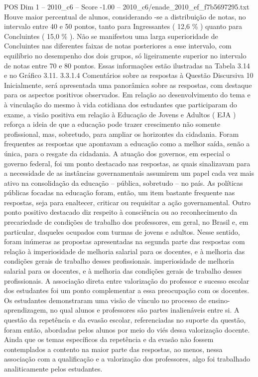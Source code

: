 \begin{textsample}{POS Dim 1 – 2010\_c6 – Score -1.00 – 2010\_c6/enade\_2010\_ef\_f7b5697295.txt}
Houve maior percentual de alunos, considerando -se a distribuição de notas, no intervalo entre 40 e 50 pontos, tanto para Ingressantes ( 12,6 \% ) quanto para Concluintes ( 15,0 \% ).
Não se manifestou uma larga superioridade de Concluintes nas diferentes faixas de notas posteriores a esse intervalo, com equilíbrio no desempenho dos dois grupos, só ligeiramente superior no intervalo de notas entre 70 e 80 pontos.
Essas informações estão ilustradas na Tabela 3.14 e no Gráfico 3.11. 3.3.1.4 Comentários sobre as respostas à Questão Discursiva 10 Inicialmente, será apresentada uma panorâmica sobre as respostas, com destaque para os aspectos positivos observados.
Em relação ao desenvolvimento do tema e à vinculação do mesmo à vida cotidiana dos estudantes que participaram do exame, a visão positiva em relação à Educação de Jovens e Adultos ( EJA ) reforça a ideia de que a educação pode trazer crescimento não somente profissional, mas, sobretudo, para ampliar os horizontes da cidadania.
Foram frequentes as respostas que apontavam a educação como a melhor saída, senão a única, para o resgate da cidadania.
A atuação dos governos, em especial o governo federal, foi um ponto destacado nas respostas, as quais sinalizavam para a necessidade de as instâncias governamentais assumirem um papel cada vez mais ativo na consolidação da educação – pública, sobretudo – no país.
As políticas públicas focadas na educação foram, então, um item bastante frequente nas respostas, seja para enaltecer, criticar ou requisitar a ação governamental.
Outro ponto positivo destacado diz respeito à consciência ou ao reconhecimento da precariedade de condições de trabalho dos professores, em geral, no Brasil e, em particular, daqueles ocupados com turmas de jovens e adultos.
Nesse sentido, foram inúmeras as propostas apresentadas na segunda parte das respostas com relação à imperiosidade de melhoria salarial para os docentes, e à melhoria das condições gerais de trabalho desses profissionais. imperiosidade de melhoria salarial para os docentes, e à melhoria das condições gerais de trabalho desses profissionais.
A associação direta entre valorização do professor e sucesso escolar dos estudantes foi um ponto complementar a essa preocupação com os docentes.
Os estudantes demonstraram uma visão de vínculo no processo de ensino-aprendizagem, no qual alunos e professores são partes inalienáveis entre si.
A questão da repetência e da evasão escolar, referenciadas no suporte da questão, foram então, abordadas pelos alunos por meio do viés dessa valorização docente.
Ainda que os temas específicos da repetência e da evasão não fossem contemplados a contento na maior parte das respostas, ao menos, nessa associação com a qualificação e a valorização dos professores, algo foi trabalhado analiticamente pelos estudantes.

\end{textsample}
